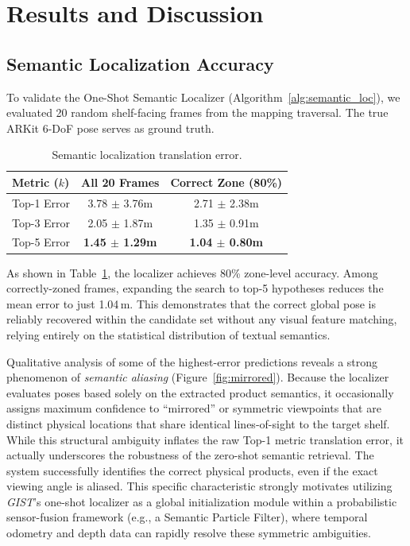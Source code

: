 \documentclass[sigconf,anonymous,review]{acmart}
\begin{document}
\section{Results and Discussion}

\subsection{Semantic Localization Accuracy}
To validate the One-Shot Semantic Localizer (Algorithm~\ref{alg:semantic_loc}), we evaluated 20 random shelf-facing frames from the mapping traversal. The true ARKit 6-DoF pose serves as ground truth.

\begin{table}[h]
\centering
\caption{Semantic localization translation error.}
\label{tab:localization}
\small
\begin{tabular}{lcc}
\toprule
\textbf{Metric ($k$)} & \textbf{All 20 Frames} & \textbf{Correct Zone (80\%)} \\
\midrule
Top-1 Error & 3.78 $\pm$ 3.76m & 2.71 $\pm$ 2.38m \\
Top-3 Error & 2.05 $\pm$ 1.87m & 1.35 $\pm$ 0.91m \\
Top-5 Error & \textbf{1.45 $\pm$ 1.29m} & \textbf{1.04 $\pm$ 0.80m} \\
\bottomrule
\end{tabular}
\vspace{-3mm}
\end{table}

As shown in Table~\ref{tab:localization}, the localizer achieves 80\% zone-level accuracy. Among correctly-zoned frames, expanding the search to top-5 hypotheses reduces the mean error to just 1.04\,m. This demonstrates that the correct global pose is reliably recovered within the candidate set without any visual feature matching, relying entirely on the statistical distribution of textual semantics. 

Qualitative analysis of some of the highest-error predictions reveals a strong phenomenon of \emph{semantic aliasing} (Figure~\ref{fig:mirrored}). Because the localizer evaluates poses based solely on the extracted product semantics, it occasionally assigns maximum confidence to ``mirrored'' or symmetric viewpoints that are distinct physical locations that share identical lines-of-sight to the target shelf. While this structural ambiguity inflates the raw Top-1 metric translation error, it actually underscores the robustness of the zero-shot semantic retrieval. The system successfully identifies the correct physical products, even if the exact viewing angle is aliased. This specific characteristic strongly motivates utilizing \emph{GIST}'s one-shot localizer as a global initialization module within a probabilistic sensor-fusion framework (e.g., a Semantic Particle Filter), where temporal odometry and depth data can rapidly resolve these symmetric ambiguities.
\end{document}
